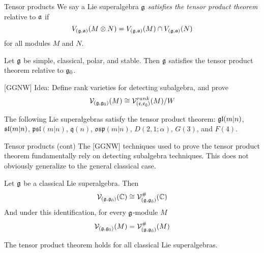 \documentclass{beamer}
\begin{document}

\begin{frame}{Tensor products}\pause
  We say a Lie superalgebra $\g$ \emph{satisfies the tensor product theorem} relative to $\a$ if
  \[
    V_{(\g,\a)}(M \otimes N) = V_{(\g,\a)}(M) \cap V_{(\g,\a)}(N)
  \]
  for all modules $M$ and $N$.
  \pause
  \begin{theorem}
    Let $\g$ be simple, classical, polar, and stable. Then $\g$ satisfies the tensor product theorem relative to $\even{\g}$.
  \end{theorem}
  [GGNW] Idea: Define rank varieties for detecting subalgebra, and prove
  \[
    \V_{(\g,\even{\g})}(M) \cong \V_{(\e,\even{\e})}^{rank}(M) / W
  \]
  
    \begin{example}
    The following Lie superalgebras satisfy the tensor product theorem: $\gl(m|n)$, $\sl(m|n)$, $\mathfrak{psl}(m|n)$, $\mathfrak{q}(n)$, $\mathfrak{osp}(m|n)$, $D(2,1;\alpha)$, $G(3)$, and $F(4)$.
  \end{example}
\end{frame}


\begin{frame}{Tensor products (cont)}
  \pause
  The [GGNW] techniques used to prove the tensor product theorem fundamentally rely on detecting subalgebra techniques. This does not obviously generalize to the general classical case.
  \pause
  \begin{conjecture}
    Let $\g$ be a classical Lie superalgebra. Then
    \[
      \V_{(\g,\even{\g})}(\CC) \cong \V_{(\g,\even{\g})}^\#(\CC)
    \]
    And under this identification, for every $\g$-module $M$
    \[
      \V_{(\g,\even{\g})}(M) = \V_{(\g,\even{\g})}^\#(M)
    \]
  \end{conjecture}
  \pause
  \begin{conjecture}
    The tensor product theorem holds for all classical Lie superalgebras.
  \end{conjecture}
\end{frame}

\end{document}
